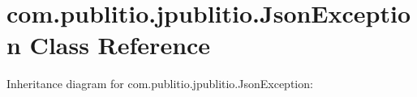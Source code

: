 \hypertarget{classcom_1_1publitio_1_1jpublitio_1_1JsonException}{}\section{com.\+publitio.\+jpublitio.\+Json\+Exception Class Reference}
\label{classcom_1_1publitio_1_1jpublitio_1_1JsonException}


Inheritance diagram for com.\+publitio.\+jpublitio.\+Json\+Exception\+:
